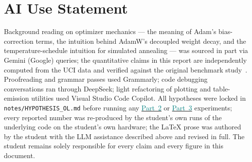 \documentclass[conference]{IEEEtran}
\newcommand{\partref}[2]{\hyperref[#2]{\textcolor{teal}{Part~#1}}}
\begin{document}
\section*{AI Use Statement}
Background reading on optimizer mechanics --- the meaning of Adam's
bias-correction terms, the intuition behind AdamW's decoupled weight decay,
and the temperature-schedule intuition for simulated annealing --- was sourced
in part via Gemini (Google) queries; the quantitative claims in this report
are independently computed from the UCI data and verified against the original
benchmark study~\cite{blackard1999}.
Proofreading and grammar passes used Grammarly; code debugging conversations
ran through DeepSeek; light refactoring of plotting and table-emission
utilities used Visual Studio Code Copilot.
All hypotheses were locked in \texttt{notes/HYPOTHESIS\_OL.md} before running
any \partref{2}{sec:p2} or \partref{3}{sec:p3} experiments; every reported number was re-produced by the
student's own runs of the underlying code on the student's own hardware; the
\LaTeX{} prose was authored by the student with the LLM assistance described
above and revised in full.
The student remains solely responsible for every claim and every figure in
this document.
\end{document}
